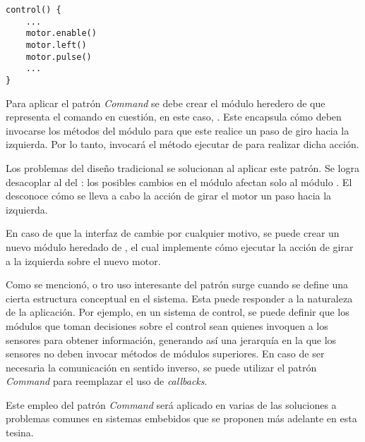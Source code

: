 \begin{lstlisting}[label={notCommand}, caption=Ejemplo de implementación sin usar el patrón \textit{Command}.]
control() {
    ...
    motor.enable()
    motor.left()
    motor.pulse()
    ... 
}
\end{lstlisting}
Para aplicar el patrón \textit{Command} se debe crear el módulo heredero de \Orden que representa el comando en cuestión, en este caso, \MotorGirarIzq. Este encapsula cómo deben invocarse los métodos del módulo \Motor para que este realice un paso de giro hacia la izquierda. Por lo tanto, \Controller invocará el método ejecutar de \MotorGirarIzq para realizar dicha acción.

Los problemas del diseño tradicional se solucionan al aplicar este patrón. Se logra desacoplar al \Motor del \Controller: los posibles cambios en el módulo \Motor afectan solo al módulo \MotorGirarIzq. El \Controller desconoce cómo se lleva a cabo la acción de girar el motor un paso hacia la izquierda.

En caso de que la interfaz de \Motor cambie por cualquier motivo, se puede crear un nuevo módulo heredado de \Orden, el cual implemente cómo ejecutar la acción de girar a la izquierda sobre el nuevo motor.

Como se mencionó, o tro uso interesante del patrón surge cuando se define una cierta estructura conceptual en el sistema. Esta puede responder a la naturaleza de la aplicación. Por ejemplo, en un sistema de control, se puede definir que los módulos que toman decisiones sobre el control sean quienes invoquen a los sensores para obtener información, generando así una jerarquía en la que los sensores no deben invocar métodos de módulos superiores. En caso de ser necesaria la comunicación en sentido inverso, se puede utilizar el patrón \textit{Command} para reemplazar el uso de \textit{callbacks}.

Este empleo del patrón \textit{Command} será aplicado en varias de las soluciones a problemas comunes en sistemas embebidos que se proponen más adelante en esta tesina.